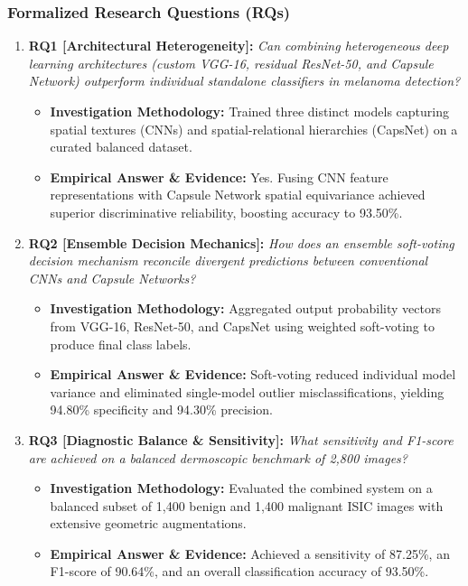 \subsubsection*{Formalized Research Questions (RQs)}
\begin{enumerate}[label=\textbf{\arabic*.}, leftmargin=*]
  \item \textbf{RQ1 [Architectural Heterogeneity]:} \textit{Can combining heterogeneous deep learning architectures (custom VGG-16, residual ResNet-50, and Capsule Network) outperform individual standalone classifiers in melanoma detection?}
  \begin{itemize}[leftmargin=1.5em]
    \item \textbf{Investigation Methodology:} Trained three distinct models capturing spatial textures (CNNs) and spatial-relational hierarchies (CapsNet) on a curated balanced dataset.
    \item \textbf{Empirical Answer \& Evidence:} Yes. Fusing CNN feature representations with Capsule Network spatial equivariance achieved superior discriminative reliability, boosting accuracy to 93.50\%.
  \end{itemize}
  \item \textbf{RQ2 [Ensemble Decision Mechanics]:} \textit{How does an ensemble soft-voting decision mechanism reconcile divergent predictions between conventional CNNs and Capsule Networks?}
  \begin{itemize}[leftmargin=1.5em]
    \item \textbf{Investigation Methodology:} Aggregated output probability vectors from VGG-16, ResNet-50, and CapsNet using weighted soft-voting to produce final class labels.
    \item \textbf{Empirical Answer \& Evidence:} Soft-voting reduced individual model variance and eliminated single-model outlier misclassifications, yielding 94.80\% specificity and 94.30\% precision.
  \end{itemize}
  \item \textbf{RQ3 [Diagnostic Balance \& Sensitivity]:} \textit{What sensitivity and F1-score are achieved on a balanced dermoscopic benchmark of 2,800 images?}
  \begin{itemize}[leftmargin=1.5em]
    \item \textbf{Investigation Methodology:} Evaluated the combined system on a balanced subset of 1,400 benign and 1,400 malignant ISIC images with extensive geometric augmentations.
    \item \textbf{Empirical Answer \& Evidence:} Achieved a sensitivity of 87.25\%, an F1-score of 90.64\%, and an overall classification accuracy of 93.50\%.

\end{itemize}
\end{enumerate}
